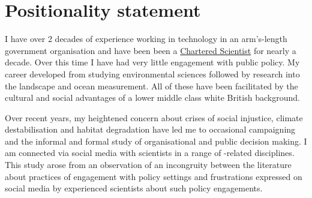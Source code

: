 \section{Positionality statement}\label{sec:metpositionality}

I have over 2 decades of experience working in technology in an arm's-length government organisation and have been been a \href{https://sciencecouncil.org/scientists-science-technicians/which-professional-award-is-right-for-me/csci/}{Chartered Scientist} for nearly a decade. Over this time I have had very little engagement with public policy. My career developed from studying environmental sciences followed by research into the landscape and ocean measurement. All of these have been facilitated by the cultural and social advantages of a lower middle class white British background.

Over recent years, my heightened concern about crises of social injustice, climate destabilisation and habitat degradation have led me to occasional campaigning and the informal and formal study of organisational and public decision making. I am connected via social media with scientists in a range of \CAN-related disciplines. This study arose from an observation of an incongruity between the literature about practices of engagement with policy settings and frustrations expressed on social media by experienced scientists about such policy engagements.



